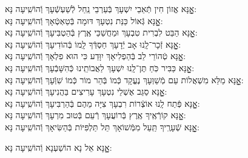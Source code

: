 \documentclass[twoside, openany, parskip=half, 11pt]{book}
\begin{document}
\begin{sometimes}
\begin{small}
אׇׇׇׇָנָּא אֱזוֹן חִין תְּֿאֵבֵי יִשְׁעָךְ בְּֿעַרְבֵי נַֽחַל לְֿשַׁעְשְֿׁעָךְ \hfill וְֿהוֹשִֽׁיעָה נָּא:\\
אׇׇׇׇָנָּא גְּֿאוֹל כַּנַּת נִטְעָךְ דּוּמָה בְּֿטַאְטְֿאָךְ \hfill וְֿהוֹשִֽׁיעָה נָּא:\\
אׇׇׇׇָנָּא הַבֵּט לִבְרִית טִבְעָךְ וּמַחֲשַׁכֵּי אֶֽרֶץ בְּֿהַטְבִּיעָךְ \hfill וְֿהוֹשִֽׁיעָה נָּא:\\
אׇׇׇׇָנָּא זְֿכָר־לָֽנוּ אָב יְֿדָעָךְ חַסְדְּֿךָ לָֽמוֹ בְּֿהוֹדִיעָךְ \hfill וְֿהוֹשִֽׁיעָה נָּא:\\
אׇׇׇׇָנָּא טְֿהוֹרֵי לֵב בְּֿהַפְלִיאָךְ יִוָּדַע כִּי הוּא פִלְאָךְ \hfill וְֿהוֹשִֽׁיעָה נָּא:\\
אׇׇׇׇָנָּא כַּבִּיר כֹּֽחַ תֶּן־לָֽנוּ יִשְׁעָךְ לַאֲבוֹתֵֽינוּ כְּֿהִשָּׁבְֿעָךְ \hfill וְֿהוֹשִֽׁיעָה נָּא:\\
אׇׇׇׇָנָּא מַלֵּא מִשְׁאֲלוֹת עַם מְֿשַׁוְּעָךְ נֶעֱקָד כְּֿמוֹ בְּֿהַר מוֹר כְּֿמוֹ שִׁוְּֿעָךְ \hfill וְֿהוֹשִֽׁיעָה נָּא:\\
אׇׇׇׇָנָּא סַגֵּב אֶשְׁלֵי נִטְעָךְ עָרִיצִים בַּהֲנִיעָךְ \hfill וְֿהוֹשִֽׁיעָה נָּא:\\
אׇׇׇׇָנָּא פְּֿתַח לָֽנוּ אוֹצְֿרוֹת רִבְעָךְ צִיָּה מֵהֶם בְּֿהַרְבִּיעָךְ \hfill וְֿהוֹשִֽׁיעָה נָּא:\\
אׇׇׇׇָנָּא קוֹרְֿאֶֽיךָ אֶֽרֶץ בְּֿרוֹעֲעָךְ רְֿעֵם בְּֿטוּב מִרְעָךְ \hfill וְֿהוֹשִֽׁיעָה נָּא:\\
אׇׇׇׇָנָּא שְֿׁעָרֶֽיךָ תַּֽעַל מִמְּֿשׁוֹאָךְ תֵּל תַּלְפִּיּוֹת בְּֿהַשִּׂיאָךְ \hfill וְֿהוֹשִֽׁיעָה נָּא:

\end{small}

\begin{large}
\shatzvkahal
 אׇׇׇׇָנָּא אֵל נָא הוֹשַׁעְנָא וְֿהוֹשִֽׁיעָה נָּא:

\end{large}


\end{sometimes}
\end{document}

